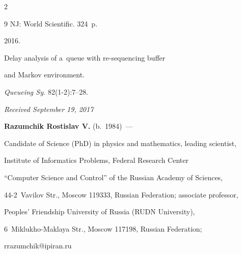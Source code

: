 \begin{multicols}{2}
{{\begin{thebibliography}{9}
NJ: World Scientific. 324~p.







 2016.


Delay analysis of a~queue with re-sequencing buffer


and Markov environment.


\textit{Queueing Sy.} 82(1-2):7--28.





\end{thebibliography} }


 }





\end{multicols}





\vspace*{-3pt}





\hfill{\small\textit{Received September 19, 2017}}













\Contrl





\noindent


\textbf{Razumchik Rostislav V.} (b.\ 1984)~--- 


Candidate of Science (PhD) in physics and mathematics, leading scientist, 


Institute of Informatics Problems, Federal Research Center 


``Computer Science and Control'' of the Russian Academy of Sciences, 


44-2~Vavilov Str., Moscow 119333, Russian Federation; associate professor, 


Peoples' Friendship University of Russia (RUDN University), 


6~Miklukho-Maklaya Str., Moscow 117198, Russian Federation; 


\mbox{rrazumchik@ipiran.ru}


